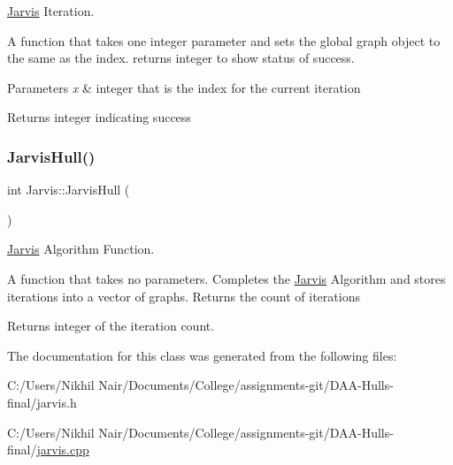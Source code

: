 \mbox{\hyperlink{class_jarvis}{Jarvis}} Iteration. 

A function that takes one integer parameter and sets the global graph object to the same as the index. returns integer to show status of success. 
\begin{DoxyParams}{Parameters}
{\em x} & integer that is the index for the current iteration \\
\hline
\end{DoxyParams}
\begin{DoxyReturn}{Returns}
integer indicating success 
\end{DoxyReturn}
\mbox{\label{class_jarvis_ac308172763e2c419813f17161ae539ef}} 
\subsubsection{\texorpdfstring{JarvisHull()}{JarvisHull()}}
{\footnotesize\ttfamily int Jarvis\+::\+Jarvis\+Hull (\begin{DoxyParamCaption}{ }\end{DoxyParamCaption})\hspace{0.3cm}{\ttfamily [static]}}



\mbox{\hyperlink{class_jarvis}{Jarvis}} Algorithm Function. 

A function that takes no parameters. Completes the \mbox{\hyperlink{class_jarvis}{Jarvis}} Algorithm and stores iterations into a vector of graphs. Returns the count of iterations

\begin{DoxyReturn}{Returns}
integer of the iteration count. 
\end{DoxyReturn}


The documentation for this class was generated from the following files\+:\begin{DoxyCompactItemize}
\item 
C\+:/\+Users/\+Nikhil Nair/\+Documents/\+College/assignments-\/git/\+D\+A\+A-\/\+Hulls-\/final/jarvis.\+h\item 
C\+:/\+Users/\+Nikhil Nair/\+Documents/\+College/assignments-\/git/\+D\+A\+A-\/\+Hulls-\/final/\mbox{\hyperlink{jarvis_8cpp}{jarvis.\+cpp}}\end{DoxyCompactItemize}
